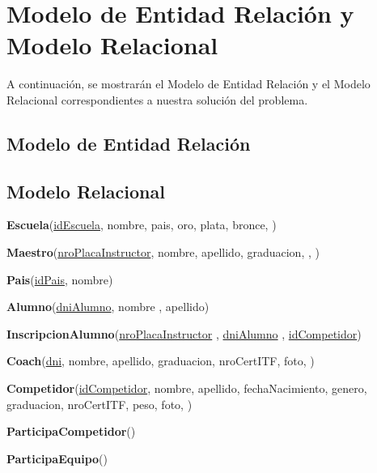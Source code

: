 \section{Modelo de Entidad Relación y Modelo Relacional}

A continuación, se mostrarán el Modelo de Entidad Relación y el Modelo Relacional correspondientes a nuestra solución del problema.

\subsection{Modelo de Entidad Relación}

\subsection{Modelo Relacional}

\textbf{Escuela}(\uline{idEscuela}, nombre, pais, oro, plata, bronce, )


\textbf{Maestro}(\uline{nroPlacaInstructor}, nombre, apellido, graduacion, , )

\textbf{Pais}(\uline{idPais}, nombre)

\textbf{Alumno}(\uline{dniAlumno}, nombre , apellido)

\textbf{InscripcionAlumno}(\uline{nroPlacaInstructor} , \uline{dniAlumno} , \uline{idCompetidor})

\textbf{Coach}(\uline{dni}, nombre, apellido, graduacion, nroCertITF, foto,  )

\textbf{Competidor}(\uline{idCompetidor}, nombre, apellido, fechaNacimiento, genero, graduacion, nroCertITF, peso, foto, )

\textbf{ParticipaCompetidor}()

\textbf{ParticipaEquipo}()



